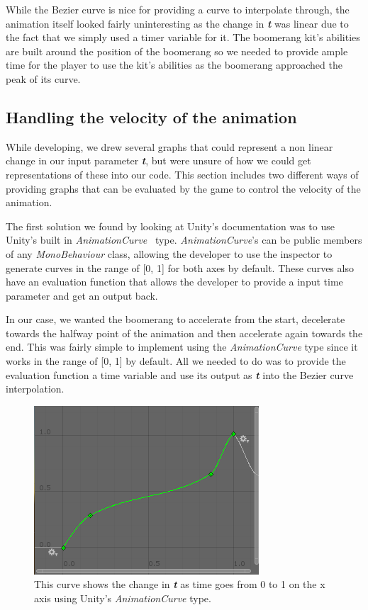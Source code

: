 While the Bezier curve is nice for providing a curve to interpolate through, the animation itself looked fairly uninteresting as the change in \textbf{\textit{t}} was linear due to the fact that we simply used a timer variable for it. The boomerang kit's abilities are built around the position of the boomerang so we needed to provide ample time for the player to use the kit's abilities as the boomerang approached the peak of its curve. 

\subsection{Handling the velocity of the animation}
While developing, we drew several graphs that could represent a non linear change in our input parameter \textbf{\textit{t}}, but were unsure of how we could get representations of these into our code. This section includes two different ways of providing graphs that can be evaluated by the game to control the velocity of the animation.

The first solution we found by looking at Unity's documentation was to use Unity's built in \emph{AnimationCurve}~\cite{unityDocumentationAnimationCurve} type. \emph{AnimationCurve}'s can be public members of any \emph{MonoBehaviour} class, allowing the developer to use the inspector to generate curves in the range of [0, 1] for both axes by default. These curves also have an evaluation function that allows the developer to provide a input time parameter and get an output back. 

In our case, we wanted the boomerang to accelerate from the start, decelerate towards the halfway point of the animation and then accelerate again towards the end. This was fairly simple to implement using the \emph{AnimationCurve} type since it works in the range of [0, 1] by default. All we needed to do was to provide the evaluation function a time variable and use its output as \textbf{\textit{t}} into the Bezier curve interpolation. 
    
\begin{figure}[tbph]  %
  \centering
  \includegraphics[width=.75\textwidth]{images/BoomerangAnimationCurve}
  \caption[Boomerang animation curve using Unity's built in type]{This curve shows the change in \textbf{\textit{t}} as time goes from 0 to 1 on the x axis using Unity's \emph{AnimationCurve} type.}
  \label{fig:boomerangcurve0}
\end{figure}


